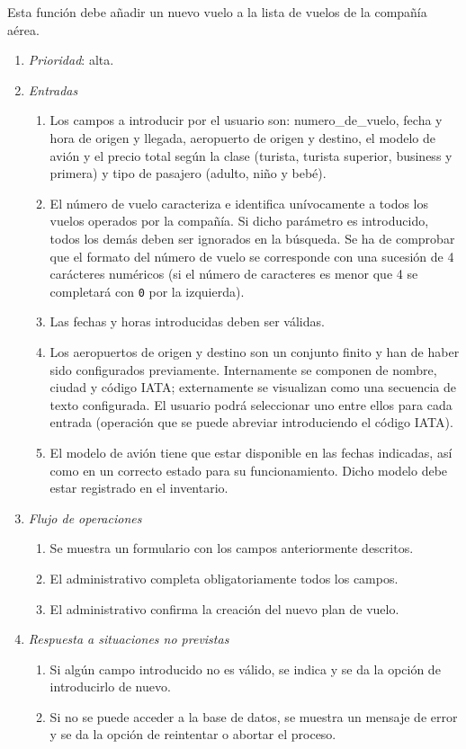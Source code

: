 

	Esta función debe añadir un nuevo vuelo a la lista de vuelos de la compañía aérea.

	\begin{enumerate}
		\item \textit{Prioridad}: alta.
		\item \textit{Entradas}
		\begin{enumerate}
			\item Los campos a introducir por el usuario son: \gls{numero_de_vuelo}, fecha y hora de origen y llegada, aeropuerto de origen y destino, el modelo de avión y el  precio total según la clase (turista, turista superior, business y primera) y tipo de pasajero (adulto, niño y bebé).
			\item El número de vuelo caracteriza e identifica unívocamente a todos los vuelos operados por la compañía. Si dicho parámetro es introducido, todos los demás deben ser ignorados en la búsqueda. Se ha de comprobar que el formato del número de vuelo se corresponde con una sucesión de 4 carácteres numéricos (si el número de caracteres es menor que 4 se completará con \verb|0| por la izquierda).
			\item Las fechas y horas introducidas deben ser válidas.
			\item Los aeropuertos de origen y destino son un conjunto finito y han de haber sido configurados previamente. Internamente se componen de nombre, ciudad y código \gls{IATA}; externamente se visualizan como una secuencia de texto configurada. El usuario podrá seleccionar uno entre ellos para cada entrada (operación que se puede abreviar introduciendo el código IATA).
			\item El modelo de avión tiene que estar disponible en las fechas indicadas, así como en un correcto estado para su funcionamiento. Dicho modelo debe estar registrado en el inventario.
		\end{enumerate}
		\item \textit{Flujo de operaciones}
		\begin{enumerate}
			\item Se muestra un formulario con los campos anteriormente descritos.
			\item El administrativo completa obligatoriamente todos los campos.
			\item El administrativo confirma la creación del nuevo plan de vuelo.
		\end{enumerate}
		\item \textit{Respuesta a situaciones no previstas}
		\begin{enumerate}
			\item Si algún campo introducido no es válido, se indica y se da la opción de introducirlo de nuevo.
			\item Si no se puede acceder a la base de datos, se muestra un mensaje de error y se da la opción de reintentar o abortar el proceso.
		\end{enumerate}
	\end{enumerate}
	
